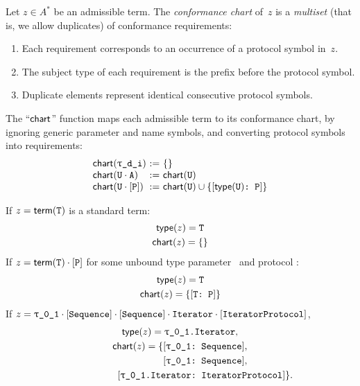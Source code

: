 \documentclass[../generics]{subfiles}
\begin{document}
\begin{definition}
Let $z\in A^*$ be an admissible term. The \emph{conformance chart} of~$z$ is a \emph{multiset} (that is, we allow duplicates) of conformance requirements:
\begin{enumerate}
\item Each requirement corresponds to an occurrence of a protocol symbol in~$z$.

\item The subject type of each requirement is the prefix before the protocol symbol.

\item Duplicate elements represent identical consecutive protocol symbols.
\end{enumerate}
\end{definition}

\begin{definition}
The ``$\mathsf{chart}$'' function maps each admissible term to its conformance chart, by ignoring generic parameter and name symbols, and converting protocol symbols into requirements:
\[
\begin{array}{l@{\ :=\ }l}
\Chart(\ttgp{d}{i})&\{\}\\
\Chart(\tU \cdot \nA)&\Chart(\tU)\\
\Chart(\tU \cdot \pP)&\Chart(\tU) \cup \{ \ConfReq{$\Type(\tU)$}{P} \}
\end{array}
\]
\end{definition}

\begin{example}
If $z=\mathsf{term}(\texttt{T})$ is a standard term:
\begin{gather*}
\mathsf{type}(z)=\texttt{T}\\
\mathsf{chart}(z)=\{\}
\end{gather*}
If $z=\mathsf{term}(\texttt{T})\cdot[\texttt{P}]$ for some unbound type parameter \tT\ and protocol \pP:
\begin{gather*}
\mathsf{type}(z)=\texttt{T}\\
\mathsf{chart}(z)=\{[\texttt{T:~P}]\}
\end{gather*}
If $z=\rU \cdot \pSequence \cdot \pSequence \cdot \nIterator \cdot \pIterator$,
\begin{gather*}
\Type(z) = \texttt{\rU.Iterator},\\
\Chart(z) = \{\ConfReq{\rU}{Sequence},\\
\phantom{\Chart(z) = \{}\ConfReq{\rU}{Sequence},\\
\phantom{\Chart(z) = \{}\ConfReq{\rU.Iterator}{IteratorProtocol}\}.
\end{gather*}
\end{example}
\end{document}
